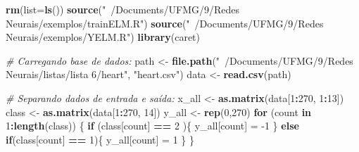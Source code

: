 \documentclass[
]{article}
\newenvironment{Shaded}{\begin{snugshade}}{\end{snugshade}}
\newcommand{\CommentTok}[1]{\textcolor[rgb]{0.56,0.35,0.01}{\textit{#1}}}
\newcommand{\ControlFlowTok}[1]{\textcolor[rgb]{0.13,0.29,0.53}{\textbf{#1}}}
\newcommand{\DataTypeTok}[1]{\textcolor[rgb]{0.13,0.29,0.53}{#1}}
\newcommand{\DecValTok}[1]{\textcolor[rgb]{0.00,0.00,0.81}{#1}}
\newcommand{\KeywordTok}[1]{\textcolor[rgb]{0.13,0.29,0.53}{\textbf{#1}}}
\newcommand{\NormalTok}[1]{#1}
\newcommand{\OperatorTok}[1]{\textcolor[rgb]{0.81,0.36,0.00}{\textbf{#1}}}
\newcommand{\StringTok}[1]{\textcolor[rgb]{0.31,0.60,0.02}{#1}}
\begin{document}
\begin{Shaded}
\begin{Highlighting}[]
\KeywordTok{rm}\NormalTok{(}\DataTypeTok{list=}\KeywordTok{ls}\NormalTok{())}
\KeywordTok{source}\NormalTok{(}\StringTok{"~/Documents/UFMG/9/Redes Neurais/exemplos/trainELM.R"}\NormalTok{)}
\KeywordTok{source}\NormalTok{(}\StringTok{"~/Documents/UFMG/9/Redes Neurais/exemplos/YELM.R"}\NormalTok{)}
\KeywordTok{library}\NormalTok{(caret)}

\CommentTok{# Carregando base de dados:}
\NormalTok{path <-}\StringTok{ }\KeywordTok{file.path}\NormalTok{(}\StringTok{"~/Documents/UFMG/9/Redes Neurais/listas/lista 6/heart"}\NormalTok{, }\StringTok{"heart.csv"}\NormalTok{)}
\NormalTok{data <-}\StringTok{ }\KeywordTok{read.csv}\NormalTok{(path)}

\CommentTok{# Separando dados de entrada e saída:}
\NormalTok{x_all <-}\StringTok{ }\KeywordTok{as.matrix}\NormalTok{(data[}\DecValTok{1}\OperatorTok{:}\DecValTok{270}\NormalTok{, }\DecValTok{1}\OperatorTok{:}\DecValTok{13}\NormalTok{])}
\NormalTok{class <-}\StringTok{ }\KeywordTok{as.matrix}\NormalTok{(data[}\DecValTok{1}\OperatorTok{:}\DecValTok{270}\NormalTok{, }\DecValTok{14}\NormalTok{])}
\NormalTok{y_all <-}\StringTok{ }\KeywordTok{rep}\NormalTok{(}\DecValTok{0}\NormalTok{,}\DecValTok{270}\NormalTok{)}
\ControlFlowTok{for}\NormalTok{ (count }\ControlFlowTok{in} \DecValTok{1}\OperatorTok{:}\KeywordTok{length}\NormalTok{(class)) \{}
  \ControlFlowTok{if}\NormalTok{ (class[count] }\OperatorTok{==}\StringTok{ }\DecValTok{2}\NormalTok{ )\{}
\NormalTok{    y_all[count] =}\StringTok{ }\DecValTok{-1}
\NormalTok{  \}}
  \ControlFlowTok{else} \ControlFlowTok{if}\NormalTok{(class[count] }\OperatorTok{==}\StringTok{ }\DecValTok{1}\NormalTok{)\{}
\NormalTok{    y_all[count] =}\StringTok{ }\DecValTok{1}
\NormalTok{  \}}
\NormalTok{\}}


\end{Highlighting}
\end{Shaded}
\end{document}
